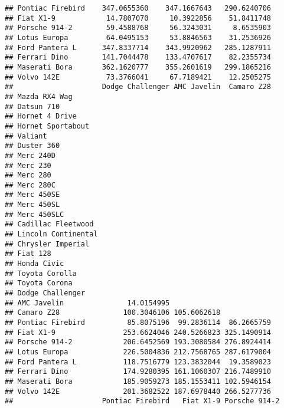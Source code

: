 \documentclass[]{book}
\begin{document}
\begin{verbatim}
## Pontiac Firebird    347.0655360    347.1667643   290.6240706
## Fiat X1-9            14.7807070     10.3922856    51.8411748
## Porsche 914-2        59.4588768     56.3243031     8.6535903
## Lotus Europa         64.0495153     53.8846563    31.2536926
## Ford Pantera L      347.8337714    343.9920962   285.1287911
## Ferrari Dino        141.7044478    133.4707617    82.2355734
## Maserati Bora       362.1620777    355.2601619   299.1865216
## Volvo 142E           73.3766041     67.7189421    12.2505275
##                     Dodge Challenger AMC Javelin  Camaro Z28
## Mazda RX4 Wag                                               
## Datsun 710                                                  
## Hornet 4 Drive                                              
## Hornet Sportabout                                           
## Valiant                                                     
## Duster 360                                                  
## Merc 240D                                                   
## Merc 230                                                    
## Merc 280                                                    
## Merc 280C                                                   
## Merc 450SE                                                  
## Merc 450SL                                                  
## Merc 450SLC                                                 
## Cadillac Fleetwood                                          
## Lincoln Continental                                         
## Chrysler Imperial                                           
## Fiat 128                                                    
## Honda Civic                                                 
## Toyota Corolla                                              
## Toyota Corona                                               
## Dodge Challenger                                            
## AMC Javelin               14.0154995                        
## Camaro Z28               100.3046106 105.6062618            
## Pontiac Firebird          85.8075196  99.2836114  86.2665759
## Fiat X1-9                253.6624046 240.5266823 325.1490914
## Porsche 914-2            206.6452569 193.3080584 276.8924414
## Lotus Europa             226.5004836 212.7568765 287.6179004
## Ford Pantera L           118.7516779 123.3832044  19.3589023
## Ferrari Dino             174.9280395 161.1060307 216.7489910
## Maserati Bora            185.9059273 185.1553411 102.5946154
## Volvo 142E               201.3682522 187.6978440 266.5277736
##                     Pontiac Firebird   Fiat X1-9 Porsche 914-2

\end{verbatim}
\end{document}

